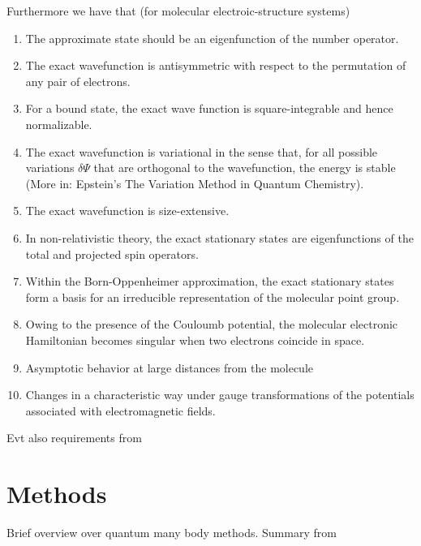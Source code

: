 \documentclass[twoside,english]{uiofysmaster}
\begin{document}
Furthermore we have that \cite{Helgaker2000} (for molecular electroic-structure systems)
\begin{enumerate}
	\item The approximate state should be an eigenfunction of the number operator.
	\item The exact wavefunction is antisymmetric with respect to the permutation of any pair of electrons.
	\item For a bound state, the exact wave function is square-integrable and hence normalizable.
	\item The exact wavefunction is variational in the sense that, for all possible variations $\delta \Psi$ that are orthogonal to the wavefunction, the energy is stable (More in: Epstein's The Variation Method in Quantum Chemistry).
	\item The exact wavefunction is size-extensive. 
	\item In non-relativistic theory, the exact stationary states are eigenfunctions of the total and projected spin operators.
	\item Within the Born-Oppenheimer approximation, the exact stationary states form a basis for an irreducible representation of the molecular point group. 
	\item Owing to the presence of the Couloumb potential, the molecular electronic Hamiltonian becomes singular when two electrons coincide in space.
	\item Asymptotic behavior at large distances from the molecule
	\item Changes in a characteristic way under gauge transformations of the potentials associated with electromagnetic fields.
\end{enumerate}


Evt also requirements from \cite{Ledum2017}

\section{Methods}
Brief overview over quantum many body methods.
Summary from \cite{Ledum2017}
\end{document}
